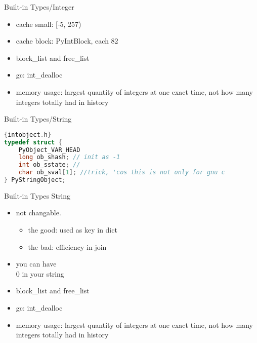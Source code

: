 \documentclass[xcolor=svgnames]{beamer}
\begin{document}
\begin{frame}{Built-in Types/Integer}
\begin{itemize} 
    \item cache small: [-5, 257)
  \pause
  \item cache block: PyIntBlock, each 82
  \pause 
  \item block\_list and free\_list
  \pause 
  \item gc: int\_dealloc
  \pause
  \item memory usage: largest quantity of integers at one exact time, not how many integers totally had in history
\end{itemize}
\end{frame}

\begin{frame}[fragile]{Built-in Types/String}
\begin{lstlisting}[language=C]{intobject.h}
typedef struct {
    PyObject_VAR_HEAD
    long ob_shash; // init as -1
    int ob_sstate; //
    char ob_sval[1]; //trick, 'cos this is not only for gnu c
} PyStringObject;
\end{lstlisting} 
\end{frame}

\begin{frame}{Built-in Types}
String
\begin{itemize} 
  \item not changable.
      \begin{itemize}
        \item the good: used as key in dict
        \item the bad: efficiency in join
      \end{itemize}
  \pause
  \item you can have \\0 in your string 
  \pause 
  \item block\_list and free\_list
  \pause 
  \item gc: int\_dealloc
  \pause
  \item memory usage: largest quantity of integers at one exact time, not how
      many integers totally had in history
    \end{itemize} 
\end{frame}
\end{document}
